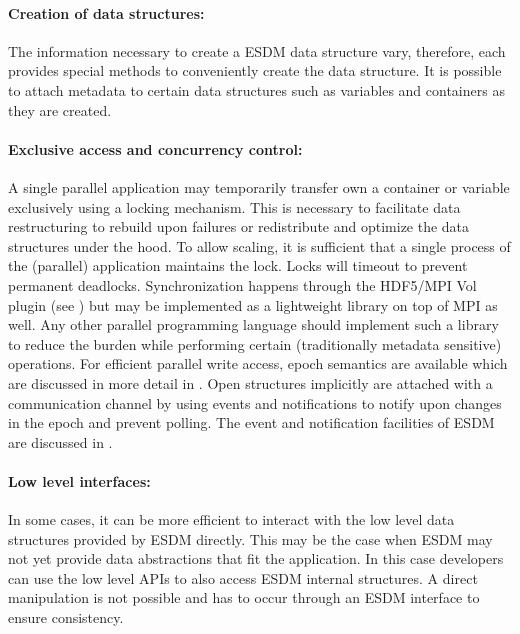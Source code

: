 \paragraph{Creation of data structures:}
The information necessary to create a ESDM data structure vary, therefore, each provides special methods to conveniently create the data structure.
It is possible to attach metadata to certain data structures such as variables and containers as they are created.


\paragraph{Exclusive access and concurrency control:}
A single parallel application may temporarily transfer own a container or variable exclusively using a locking mechanism.
This is necessary to facilitate data restructuring to rebuild upon failures or redistribute and optimize the data structures under the hood.
To allow scaling, it is sufficient that a single process of the (parallel) application maintains the lock.
Locks will timeout to prevent permanent deadlocks.
Synchronization happens through the HDF5/MPI Vol plugin (see ) but may be implemented as a lightweight  library on top of MPI as well.
Any other parallel programming language should implement such a library to reduce the burden while performing certain (traditionally metadata sensitive) operations.
For efficient parallel write access, epoch semantics are available which are discussed in more detail in .
Open structures implicitly are attached with a communication channel by using events and notifications to notify upon changes in the epoch and prevent polling.
The event and notification facilities of ESDM are discussed in .


\paragraph{Low level interfaces:}
In some cases, it can be more efficient to interact with the low level data structures provided by ESDM directly.
This may be the case when ESDM may not yet provide data abstractions that fit the application.
In this case developers can use the low level APIs to also access ESDM internal structures.
A direct manipulation is not possible and has to occur through an ESDM interface to ensure consistency.






